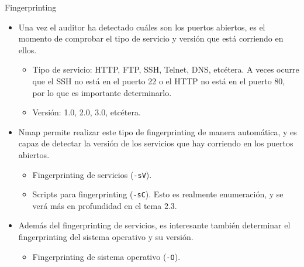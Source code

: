 \documentclass[aspectratio=169,11pt]{beamer}
\newcommand{\cmd}[1]{\texttt{\color{uznavy}#1}}
\begin{document}
\begin{frame}{Fingerprinting}
\small
  \begin{itemize}
  \item Una vez el auditor ha detectado cuáles son los puertos abiertos, es el momento de comprobar el tipo de servicio y versión que está corriendo en ellos.
    \begin{itemize}
    \item Tipo de servicio: HTTP, FTP, SSH, Telnet, DNS, etcétera. A veces ocurre que el SSH no está en el puerto 22 o el HTTP no está en el puerto 80, por lo que es importante determinarlo.
    \item Versión: 1.0, 2.0, 3.0, etcétera.
    \end{itemize}
  \item Nmap permite realizar este tipo de fingerprinting de manera automática, y es capaz de detectar la versión de los servicios que hay corriendo en los puertos abiertos.
    \begin{itemize}
    \item Fingerprinting de servicios (\cmd{-sV}).
    \item Scripts para fingerprinting (\cmd{-sC}). Esto es realmente enumeración, y se verá más en profundidad en el tema 2.3.
    \end{itemize}
  \item Además del fingerprinting de servicios, es interesante también determinar el fingerprinting del sistema operativo y su versión.
    \begin{itemize}
    \item Fingerprinting de sistema operativo (\cmd{-O}).
    \end{itemize}
  \end{itemize}
\end{frame}
\end{document}
